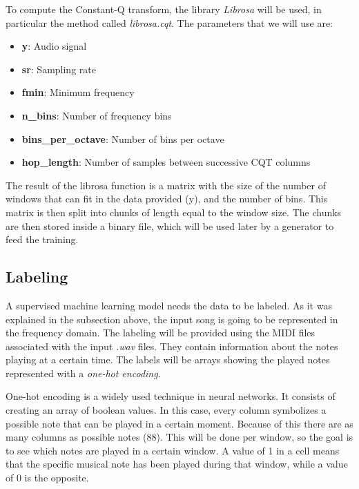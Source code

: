 \par
To compute the Constant-Q transform, the library \textit{Librosa} will be used, in particular the method called \textit{librosa.cqt}.
The parameters that we will use are:
\begin{itemize}
	\item \textbf{y}: Audio signal
	\item \textbf{sr}: Sampling rate
	\item \textbf{fmin}: Minimum frequency
	\item \textbf{n\_bins}: Number of frequency bins
	\item \textbf{bins\_per\_octave}: Number of bins per octave
	\item \textbf{hop\_length}: Number of samples between successive CQT columns
\end{itemize}
\par

The result of the librosa function is a matrix with the size of the number of windows that can fit in the data provided (y), and the number of bins. This matrix is then split into chunks of length equal to the window size. The chunks are then stored inside a binary file, which will be used later by a generator to feed the training.

\subsection{Labeling}
A supervised machine learning model needs the data to be labeled. As it was explained in the subsection above, the input song is going to be represented in the frequency domain. The labeling will be provided using the MIDI files associated with the input \textit{.wav} files. They contain information about the notes playing at a certain time. The labels will be arrays showing the played notes represented with a \textit{one-hot encoding}.
\par

One-hot encoding is a widely used technique in neural networks. It consists of creating an array of boolean values. \cite{one-hot} In this case, every column symbolizes a possible note that can be played in a certain moment. Because of this there are as many columns as possible notes (88). This will be done per window, so the goal is to see which notes are played in a certain window. A value of 1 in a cell means that the specific musical note has been played during that window, while a value of 0 is the opposite.

